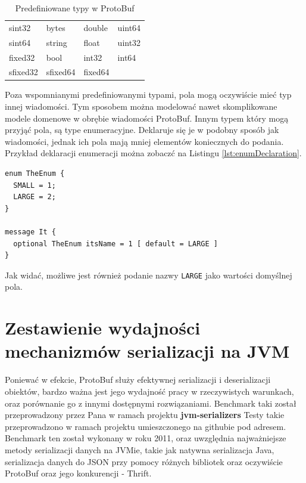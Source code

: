 \begin{table}
\begin{center}
\begin{tabular}{llll}
sint32 & bytes & double & uint64\\
sint64 & string & float & uint32\\
fixed32 & bool & int32 & int64 \\
sfixed32 & sfixed64 & fixed64 &  \\
\end{tabular}
\end{center}
\caption{Predefiniowane typy w ProtoBuf}
\label{protoYypes_all}
\end{table}

Poza wspomnianymi predefiniowanymi typami, pola mogą oczywiście mieć typ innej wiadomości. Tym sposobem można modelować nawet skomplikowane modele domenowe
w obrębie wiadomości ProtoBuf. Innym typem który mogą przyjąć pola, są type enumeracyjne. Deklaruje się je w podobny sposób jak wiadomości, jednak 
ich pola mają mniej elementów koniecznych do podania. Przykład deklaracji enumeracji można zobaczć na Listingu \ref{lst:enumDeclaration}.

\begin{lstlisting}[caption={Deklaracja oraz zastosowanie typu enumeracyjnego}, label={lst:enumDeclaration}]
enum TheEnum {
  SMALL = 1;
  LARGE = 2;
}

message It {
  optional TheEnum itsName = 1 [ default = LARGE ]
}
\end{lstlisting}

Jak widać, możliwe jest również podanie nazwy \verb|LARGE| jako wartości domyślnej pola.


\section{Zestawienie wydajności mechanizmów serializacji na JVM}
\label{sec:serialization_speed}

Poniewać w efekcie, ProtoBuf służy efektywnej serializacji i deserializacji obiektów, bardzo ważna jest jego wydajność pracy 
w rzeczywistych warunkach, oraz porównanie go z innymi dostępnymi rozwiązaniami. Benchmark taki został przeprowadzony przez Pana
w ramach projektu \textbf{jvm-serializers} \cite{Jvmserializers}
Testy takie przeprowadzono w ramach projektu umieszczonego na githubie pod adresem.
Benchmark ten został wykonany w roku 2011, oraz uwzględnia najważniejsze metody serializacji danych na JVMie, takie jak
natywna serializacja Java, serializacja danych do JSON przy pomocy różnych bibliotek oraz oczywiście ProtoBuf oraz jego konkurencji - Thrift.

